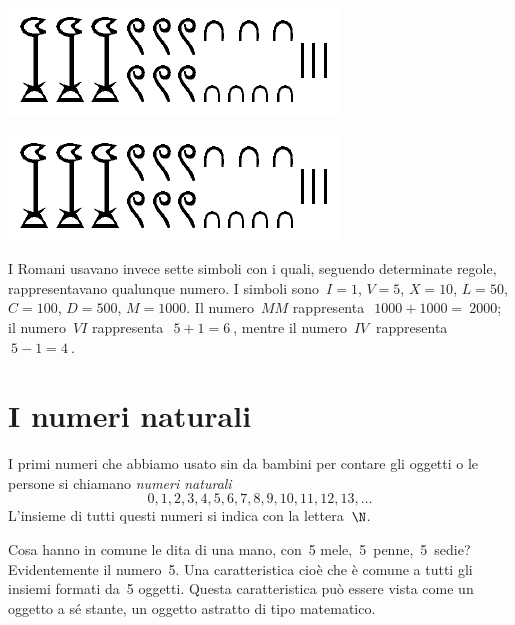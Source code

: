 \ifdefined\HCode                          %
\begin{inaccessibleblock}
\begin{center} 
\includegraphics{img/hiero3673.png} 
\end{center}
\end{inaccessibleblock}
\else
\begin{inaccessibleblock}
\vspace{-2ex}
\begin{center} \includegraphics[scale=0.25]{img/hiero3673.png} \end{center}
\vspace{-2ex}
\end{inaccessibleblock}
\fi

I Romani usavano invece sette simboli con i quali, seguendo determinate 
regole, rappresentavano qualunque numero. 
I simboli sono~\(I=1\), \(V=5\), \(X=10\), \(L=50\), \(C=100\), \(D=500\), 
\(M=1000\).
Il numero~\(MM\) rappresenta~\(~1000+1000 =~2000\); il numero~\( VI\) 
rappresenta~\(~5+1=6~\), mentre il numero~\( IV~\) rappresenta~\(~5-1=4~\).

\section{I numeri naturali}
\label{sec:nat_naturali}

I primi numeri che abbiamo usato sin da bambini per contare gli oggetti o 
le persone si chiamano \emph{numeri naturali}
\[ 0, 1, 2, 3, 4, 5, 6, 7, 8, 9, 10, 11, 12, 13, \dots \]
L'insieme di tutti questi numeri si indica con la lettera~\(\N\).

Cosa hanno in comune le dita di una mano, con~5 mele,~5~penne,~5~sedie? 
Evidentemente il numero~5. Una caratteristica cioè che è comune a tutti gli 
insiemi formati da~5 oggetti. 
Questa caratteristica può essere vista come un oggetto a sé stante, 
un oggetto astratto di tipo matematico.


